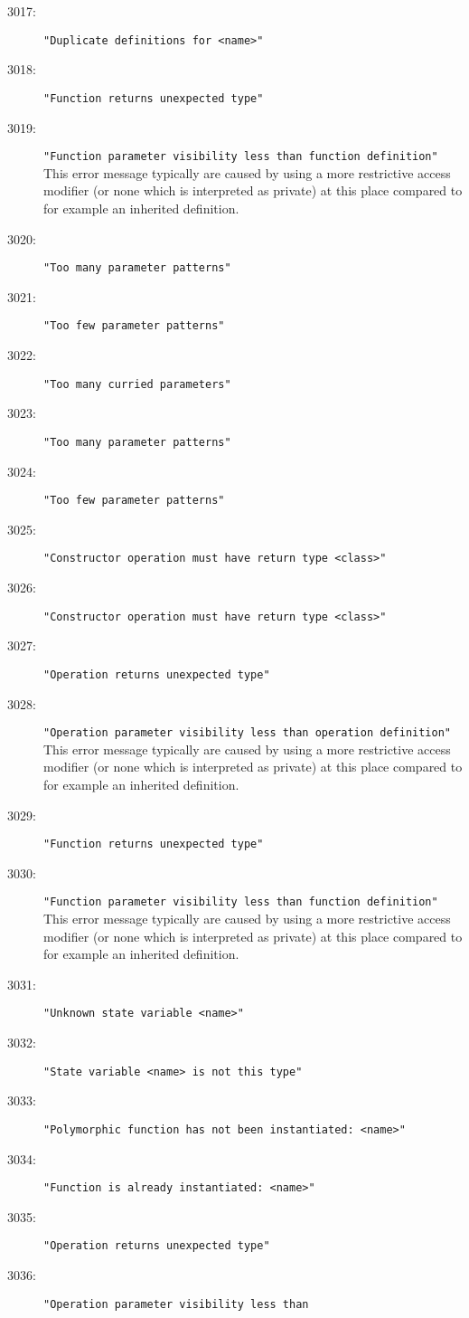 \begin{description}
\item[3017:] \texttt{"Duplicate definitions for <name>"}
\item[3018:] \texttt{"Function returns unexpected type"}
\item[3019:] \texttt{"Function parameter visibility less than function
  definition"} This
  error message typically are caused by using a more restrictive
  access modifier (or none which is interpreted as private) at this
  place compared to for example an inherited definition.
\item[3020:] \texttt{"Too many parameter patterns"}
\item[3021:] \texttt{"Too few parameter patterns"}
\item[3022:] \texttt{"Too many curried parameters"}
\item[3023:] \texttt{"Too many parameter patterns"}
\item[3024:] \texttt{"Too few parameter patterns"}
\item[3025:] \texttt{"Constructor operation must have return type <class>"}
\item[3026:] \texttt{"Constructor operation must have return type <class>"}
\item[3027:] \texttt{"Operation returns unexpected type"}
\item[3028:] \texttt{"Operation parameter visibility less than
  operation definition"} This
  error message typically are caused by using a more restrictive
  access modifier (or none which is interpreted as private) at this
  place compared to for example an inherited definition.
\item[3029:] \texttt{"Function returns unexpected type"}
\item[3030:] \texttt{"Function parameter visibility less than function
  definition"} This
  error message typically are caused by using a more restrictive
  access modifier (or none which is interpreted as private) at this
  place compared to for example an inherited definition.
\item[3031:] \texttt{"Unknown state variable <name>"}
\item[3032:] \texttt{"State variable <name> is not this type"}
\item[3033:] \texttt{"Polymorphic function has not been instantiated:\ <name>"}
\item[3034:] \texttt{"Function is already instantiated:\ <name>"}
\item[3035:] \texttt{"Operation returns unexpected type"}
\item[3036:] \texttt{"Operation parameter visibility less than
}
\end{description}
